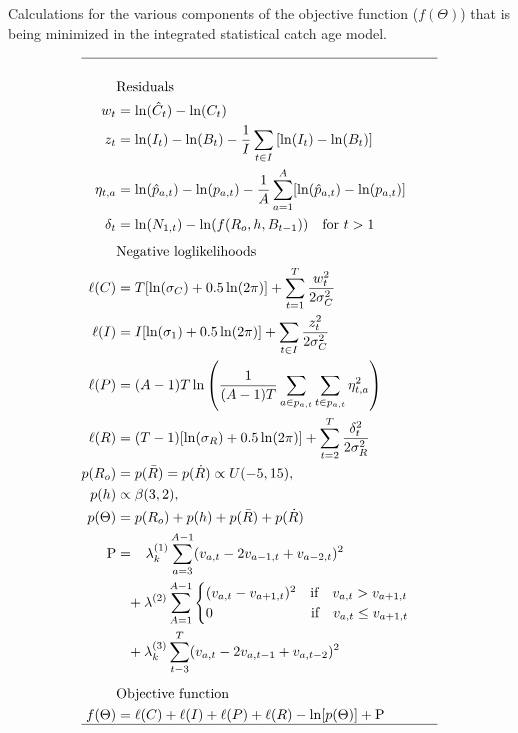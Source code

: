 \begin{table}[!tbh]
	\tableEq
	\caption{Calculations for the various components of the objective function ($f(\Theta)$) that is being minimized in the integrated statistical catch age model.}\label{tab:likelihoods}
	\begin{align}
		\hline \nonumber\\
		&\mbox{Residuals}\nonumber\\
		w_t&= \ln(\hat{C}_t) - \ln(C_t)\label{eq:T1.1}\\
		z_t&= \ln(I_t) - \ln(B_t) - \frac{1}{I}\sum_{t\in I}\left[\ln(I_t) - \ln(B_t)\right]\label{eq:T1.2}\\
		\eta_{t,a}&= \ln(\hat{p}_{a,t}) - \ln(p_{a,t})
				 - \frac{1}{A}\sum_{a=1}^A [\ln(\hat{p}_{a,t}) - \ln(p_{a,t})]
				 \label{eq:T1.3}\\
		\delta_t &= \ln(N_{1,t}) - \ln(f(R_o,h,B_{t-1})) \quad
		\mbox{for $t > 1$}\label{eq:T1.4}\\[1ex]
		&\mbox{Negative loglikelihoods}\nonumber\\
		\ell(C)& = T [\ln(\sigma_C) + 0.5\ln(2 \pi) ] +\sum_{t=1}^T
		\frac{w_t^2}{2\sigma_C^2} \label{eq:L1.1}\\
		\ell(I)& = I[\ln(\sigma_1) + 0.5\ln(2 \pi) ] + \sum_{t \in I}
		\frac{z_t^2}{2\sigma_C^2} \label{eq:L1.2} \\
		\ell(P)& = (A-1)T \ln\left(\frac{1}{(A-1)T}\sum_{a\in p_{a,t}} 
		\sum_{t\in p_{a,t}} \eta_{t,a}^2 \right)\label{eq:L1.3} \\
		\ell(R)& = (T-1)[\ln(\sigma_R) + 0.5\ln(2 \pi) ] + \sum_{t =2}^T
		\frac{\delta_t^2}{2\sigma_R^2} \label{eq:L1.4} \\
		p(R_o)&=p(\bar{R})=p(\dot{R}) \propto U(-5,15),\nonumber\\
		p(h)   &\propto \beta(3,2),\nonumber\\
		{p}(\Theta) & = p(R_o)+ p(h) + p(\bar{R})+p(\dot{R})
			\label{eq:L1.5}\\
		\mathrm{P} & = \phantom{+} \lambda^{(1)}_k \sum_{a=3}^{A-1}(v_{a,t}-2v_{a-1,t} + v_{a-2,t})^2
		\nonumber\\
		\phantom{P} & \phantom{=}+ \lambda^{(2)}\sum_{A=1}^{A-1}
		\begin{cases}
			(v_{a,t}-v_{a+1,t})^2\quad \mbox{if}\quad v_{a,t} > v_{a+1,t}\\
			0\phantom{ (v_{a,t}-v_{a+1,t})} \quad \mbox{if} \quad v_{a,t} \leq v_{a+1,t}
		\end{cases}\nonumber\\
		\phantom{P} & \phantom{=}+ \lambda_k^{(3)} \sum_{t-3}^T
		(v_{a,t}-2v_{a,t-1} + v_{a,t-2})^2
		 \label{eq:L1.6}\\[1ex]
		&\mbox{Objective function}\nonumber\\
		f(\Theta)& = \ell(C) + \ell(I) + \ell(P) + \ell(R) -\ln[{p}(\Theta)] + \mathrm{P}\\
		\hline \nonumber
	\end{align}
	\normalEq
\end{table}

